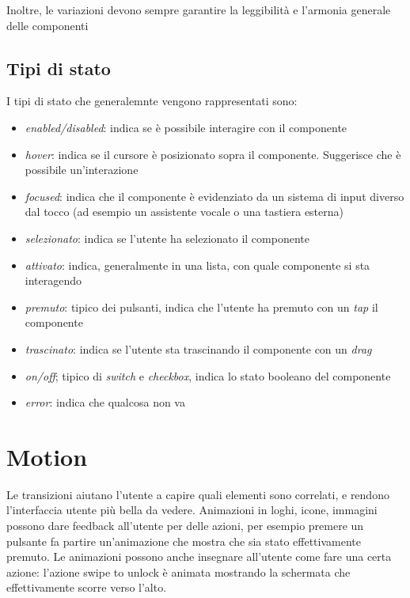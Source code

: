 \documentclass[12pt, a4paper]{report}
\begin{document}
		Inoltre, le variazioni devono sempre garantire la leggibilità e l'armonia generale delle componenti
		
			\subsection{Tipi di stato}
			I tipi di stato che generalemnte vengono rappresentati sono:
			\begin{itemize}
				\item \textit{enabled/disabled}: indica se è possibile interagire con il componente
				\item \textit{hover}: indica se il cursore è posizionato sopra il componente. Suggerisce che è possibile un'interazione
				\item \textit{focused}: indica che il componente è evidenziato da un sistema di input diverso dal tocco (ad esempio un assistente vocale o una tastiera esterna)
				\item \textit{selezionato}: indica se l'utente ha selezionato il componente
				\item \textit{attivato}: indica, generalmente in una lista, con quale componente si sta interagendo
				\item \textit{premuto}: tipico dei pulsanti, indica che l'utente ha premuto con un \textit{tap} il componente
				\item \textit{trascinato}: indica se l'utente sta trascinando il componente con un \textit{drag}
				\item \textit{on/off}; tipico di \textit{switch} e \textit{checkbox}, indica lo stato booleano del componente
				\item \textit{error}: indica che qualcosa non va
			\end{itemize}

	\section{Motion}
		Le transizioni aiutano l'utente a capire quali elementi sono correlati, e rendono l'interfaccia utente più bella da vedere.
		Animazioni in loghi, icone, immagini possono dare feedback all'utente per delle azioni, per esempio premere un pulsante fa partire un'animazione che mostra che sia stato effettivamente premuto.
		Le animazioni possono anche insegnare all'utente come fare una certa azione: l'azione swipe to unlock è animata mostrando la schermata che effettivamente scorre verso l'alto.
\end{document}
